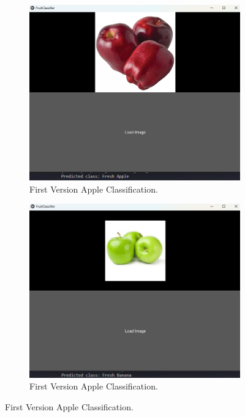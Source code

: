 \documentclass[conference]{IEEEtran}
\begin{document}
\begin{figure}[h]
    \centering
    \begin{subfigure}[b]{0.48\linewidth}
        \centering
        \includegraphics[width=\linewidth]{1layer appel1.png}
        \caption{First Version Apple Classification.}
        \label{figFA}
    \end{subfigure}
    \hfill
    \begin{subfigure}[b]{0.48\linewidth}
        \centering
        \includegraphics[width=\linewidth]{1layer appel2.png}
        \caption{First Version Apple Classification.}

\end{subfigure}
\end{figure}
\end{document}
